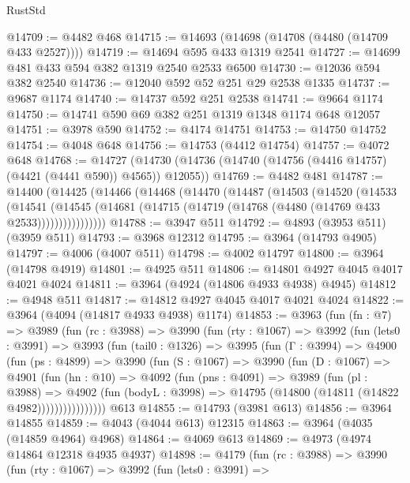 \begin{lexlean}{RustStd}
\begin{coremodule}
@14709 := @4482 @468
@14715 := @14693 (@14698 (@14708 (@4480 (@14709 @433 @2527))))
@14719 := @14694 @595 @433 @1319 @2541
@14727 := @14699 @481 @433 @594 @382 @1319 @2540 @2533 @6500
@14730 := @12036 @594 @382 @2540
@14736 := @12040 @592 @52 @251 @29 @2538 @1335
@14737 := @9687 @1174
@14740 := @14737 @592 @251 @2538
@14741 := @9664 @1174
@14750 := @14741 @590 @69 @382 @251 @1319 @1348 @1174 @648 @12057
@14751 := @3978 @590
@14752 := @4174 @14751
@14753 := @14750 @14752
@14754 := @4048 @648
@14756 := @14753 (@4412 @14754)
@14757 := @4072 @648
@14768 := @14727
    (@14730 (@14736 (@14740 (@14756 (@4416 @14757) (@4421 (@4441 @590)) @4565)) @12055))
@14769 := @4482 @481
@14787 := @14400
    (@14425
      (@14466
        (@14468
          (@14470
            (@14487
              (@14503
                (@14520
                  (@14533
                    (@14541
                      (@14545
                        (@14681 (@14715 (@14719 (@14768 (@4480 (@14769 @433 @2533))))))))))))))))
@14788 := @3947 @511
@14792 := @4893 (@3953 @511) (@3959 @511)
@14793 := @3968 @12312
@14795 := @3964 (@14793 @4905)
@14797 := @4006 (@4007 @511)
@14798 := @4002 @14797
@14800 := @3964 (@14798 @4919)
@14801 := @4925 @511
@14806 := @14801 @4927 @4045 @4017 @4021 @4024
@14811 := @3964 (@4924 (@14806 @4933 @4938) @4945)
@14812 := @4948 @511
@14817 := @14812 @4927 @4045 @4017 @4021 @4024
@14822 := @3964 (@4094 (@14817 @4933 @4938) @1174)
@14853 := @3963
    (fun (fn : @7) =>
    @3989
      (fun (rc : @3988) =>
      @3990
        (fun (rty : @1067) =>
        @3992
          (fun (lets0 : @3991) =>
          @3993
            (fun (tail0 : @1326) =>
            @3995
              (fun (Γ : @3994) =>
              @4900
                (fun (ps : @4899) =>
                @3990
                  (fun (S : @1067) =>
                  @3990
                    (fun (D : @1067) =>
                    @4901
                      (fun (hn : @10) =>
                      @4092
                        (fun (pns : @4091) =>
                        @3989
                          (fun (pl : @3988) =>
                          @4902
                            (fun (bodyL : @3998) =>
                            @14795 (@14800 (@14811 (@14822 @4982))))))))))))))))
    @613
@14855 := @14793 (@3981 @613)
@14856 := @3964 @14855
@14859 := @4043 (@4044 @613) @12315
@14863 := @3964 (@4035 (@14859 @4964) @4968)
@14864 := @4069 @613
@14869 := @4973 (@4974 @14864 @12318 @4935 @4937)
@14898 := @4179
    (fun (rc : @3988) =>
    @3990
      (fun (rty : @1067) =>
      @3992
        (fun (lets0 : @3991) =>

\end{coremodule}
\end{lexlean}
